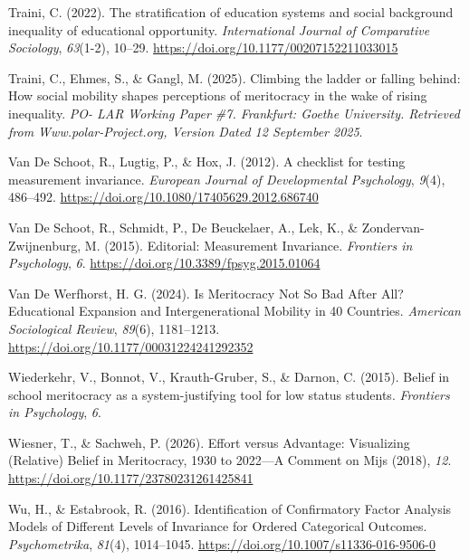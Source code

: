\documentclass[
  13pt,
]{article}
\newlength{\cslhangindent}
\newenvironment{CSLReferences}[2] %
 {\begin{list}{}{%
  \setlength{\itemindent}{0pt}
  \setlength{\leftmargin}{0pt}
  \setlength{\parsep}{0pt}
  \ifodd #1
   \setlength{\leftmargin}{\cslhangindent}
   \setlength{\itemindent}{-1\cslhangindent}
  \fi
  \setlength{\itemsep}{#2\baselineskip}}}
 {\end{list}}
\begin{document}
\begin{CSLReferences}{1}{0}
Traini, C. (2022). The stratification of education systems and social
background inequality of educational opportunity. \emph{International
Journal of Comparative Sociology}, \emph{63}(1-2), 10--29.
\url{https://doi.org/10.1177/00207152211033015}

Traini, C., Ehmes, S., \& Gangl, M. (2025). Climbing the ladder or
falling behind: {How} social mobility shapes perceptions of meritocracy
in the wake of rising inequality. \emph{PO- LAR Working Paper \#7.
Frankfurt: Goethe University. Retrieved from Www.polar-Project.org,
Version Dated 12 September 2025}.

Van De Schoot, R., Lugtig, P., \& Hox, J. (2012). A checklist for
testing measurement invariance. \emph{European Journal of Developmental
Psychology}, \emph{9}(4), 486--492.
\url{https://doi.org/10.1080/17405629.2012.686740}

Van De Schoot, R., Schmidt, P., De Beuckelaer, A., Lek, K., \&
Zondervan-Zwijnenburg, M. (2015). Editorial: {Measurement Invariance}.
\emph{Frontiers in Psychology}, \emph{6}.
\url{https://doi.org/10.3389/fpsyg.2015.01064}

Van De Werfhorst, H. G. (2024). Is {Meritocracy Not So Bad After All}?
{Educational Expansion} and {Intergenerational Mobility} in 40
{Countries}. \emph{American Sociological Review}, \emph{89}(6),
1181--1213. \url{https://doi.org/10.1177/00031224241292352}

Wiederkehr, V., Bonnot, V., Krauth-Gruber, S., \& Darnon, C. (2015).
Belief in school meritocracy as a system-justifying tool for low status
students. \emph{Frontiers in Psychology}, \emph{6}.

Wiesner, T., \& Sachweh, P. (2026). Effort versus {Advantage}:
{Visualizing} ({Relative}) {Belief} in {Meritocracy}, 1930 to 2022---{A
Comment} on {Mijs} (2018), \emph{12}.
\url{https://doi.org/10.1177/23780231261425841}

Wu, H., \& Estabrook, R. (2016). Identification of {Confirmatory Factor
Analysis Models} of {Different Levels} of {Invariance} for {Ordered
Categorical Outcomes}. \emph{Psychometrika}, \emph{81}(4), 1014--1045.
\url{https://doi.org/10.1007/s11336-016-9506-0}


\end{CSLReferences}
\end{document}
